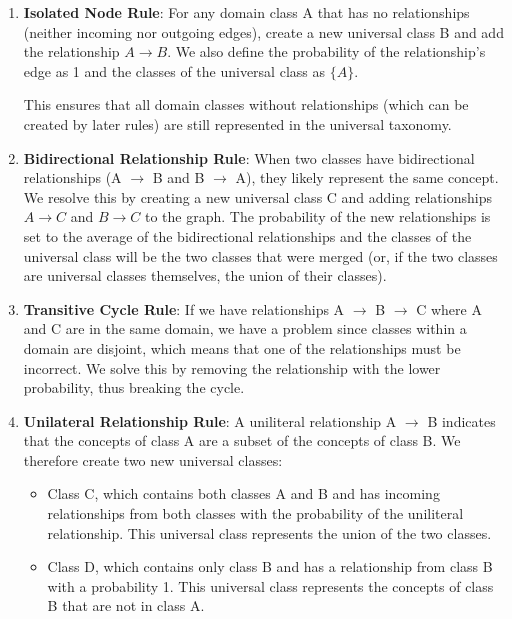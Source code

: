 \begin{enumerate}
    \item \textbf{Isolated Node Rule}: For any domain class A that has no relationships
          (neither incoming nor outgoing edges), create a new universal class B
          and add the relationship $A \rightarrow B$.
          We also define the probability of the relationship's edge as 1 and
          the classes of the universal class as $\{A\}$.

          This ensures that all domain classes without relationships (which can be created by later rules)
          are still represented in the universal taxonomy.

    \item \textbf{Bidirectional Relationship Rule}: When two classes have bidirectional relationships
          (A $\rightarrow$ B and B $\rightarrow$ A), they likely represent the same concept.
          We resolve this by creating a new universal class C and adding relationships
          $A \rightarrow C$ and $B \rightarrow C$ to the graph.
          The probability of the new relationships is set to the average of the bidirectional relationships and the classes of the universal class
          will be the two classes that were merged (or, if the two classes are universal classes themselves,
          the union of their classes).

    \item \textbf{Transitive Cycle Rule}: If we have relationships A $\rightarrow$ B $\rightarrow$ C
          where A and C are in the same domain, we have a problem since classes within a domain
          are disjoint, which means that one of the relationships must be incorrect.
          We solve this by removing the relationship with the lower probability,
          thus breaking the cycle.

    \item \textbf{Unilateral Relationship Rule}: A uniliteral relationship
          A $\rightarrow$ B indicates that the concepts of class A are a subset of the concepts of class B.
          We therefore create two new universal classes:
          \begin{itemize}
              \item Class C, which contains both classes A and B and has incoming relationships
                    from both classes with the probability of the uniliteral relationship.
                    This universal class represents the union of the two classes.
              \item Class D, which contains only class B and has a relationship from class B with a probability 1.
                    This universal class represents the concepts of class B that are not in class A.
          \end{itemize}
\end{enumerate}

